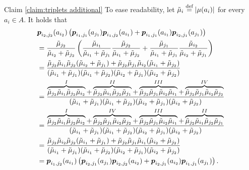 \begin{proofof}{Claim \ref{claim:triplets additional}}
To ease readability, let $\tilde \mu_{i}\stackrel{\text{def}}{=}\left| \mu(a_i) \right|$ for every $a_i\in A$. It holds that
\begin{align*}
&\boldsymbol{ p }_{{i_2},{j_2}}(a_{i_2})\left( \boldsymbol{ p }_{{i_1},{j_1}}(a_{j_1})\boldsymbol{ p }_{{i_1},{j_2}}(a_{i_1})+\boldsymbol{ p }_{{i_1},{j_1}}(a_{i_1})\boldsymbol{ p }_{{i_2},{j_1}}(a_{j_1})\right)\\
&=\frac{\tilde \mu_{j_2}}{\tilde \mu_{i_2}+\tilde \mu_{j_2}}\left( \frac{\tilde \mu_{i_1}}{\tilde \mu_{i_1}+\tilde \mu_{j_1}}\frac{\tilde \mu_{j_2}}{\tilde \mu_{i_1}+\tilde \mu_{j_2}}+\frac{\tilde \mu_{j_1}}{\tilde \mu_{i_1}+\tilde \mu_{j_1}}\frac{\tilde \mu_{i_2}}{\tilde \mu_{i_2}+\tilde \mu_{j_1}}\right) \\
&= \frac{\tilde \mu_{j_2}\tilde \mu_{i_1}\tilde \mu_{j_2}(\tilde \mu_{i_2}+\tilde \mu_{j_1})+\tilde \mu_{j_2}\tilde \mu_{j_1}\tilde \mu_{i_2}(\tilde \mu_{i_1}+\tilde \mu_{j_2})}{(\tilde \mu_{i_1}+\tilde \mu_{j_1})(\tilde \mu_{i_1}+\tilde \mu_{j_2})(\tilde \mu_{i_2}+\tilde \mu_{j_1})(\tilde \mu_{i_2}+\tilde \mu_{j_2})}\\
&= \frac{\overbrace{\tilde \mu_{j_2}\tilde \mu_{i_1}\tilde \mu_{j_2}\tilde \mu_{i_2}}^{I}+\overbrace{\tilde \mu_{j_2}\tilde \mu_{i_1}\tilde \mu_{j_2}\tilde \mu_{j_1}}^{II}+\overbrace{\tilde \mu_{j_2}\tilde \mu_{j_1}\tilde \mu_{i_2}\tilde \mu_{i_1}}^{III}+\overbrace{\tilde \mu_{j_2}\tilde \mu_{j_1}\tilde \mu_{i_2}\tilde \mu_{j_2}}^{IV}}{(\tilde \mu_{i_1}+\tilde \mu_{j_1})(\tilde \mu_{i_1}+\tilde \mu_{j_2})(\tilde \mu_{i_2}+\tilde \mu_{j_1})(\tilde \mu_{i_2}+\tilde \mu_{j_2})}\\
&= \frac{\overbrace{\tilde \mu_{j_2}\tilde \mu_{i_1}\tilde \mu_{j_2}\tilde \mu_{i_2}}^{I}+\overbrace{\tilde \mu_{j_2}\tilde \mu_{j_1}\tilde \mu_{i_2}\tilde \mu_{j_2}}^{IV}+\overbrace{\tilde \mu_{j_2}\tilde \mu_{j_1}\tilde \mu_{i_2}\tilde \mu_{i_1}}^{III}+\overbrace{\tilde \mu_{j_2}\tilde \mu_{i_1}\tilde \mu_{j_2}\tilde \mu_{j_1}}^{II}}{(\tilde \mu_{i_1}+\tilde \mu_{j_1})(\tilde \mu_{i_1}+\tilde \mu_{j_2})(\tilde \mu_{i_2}+\tilde \mu_{j_1})(\tilde \mu_{i_2}+\tilde \mu_{j_2})}\\
&= \frac{\tilde \mu_{j_2}\tilde \mu_{i_2}\tilde \mu_{j_2}(\tilde \mu_{i_1}+\tilde \mu_{j_1})+\tilde \mu_{j_2}\tilde \mu_{j_1}\tilde \mu_{i_1}(\tilde \mu_{i_2}+\tilde \mu_{j_2})}{(\tilde \mu_{i_1}+\tilde \mu_{j_1})(\tilde \mu_{i_1}+\tilde \mu_{j_2})(\tilde \mu_{i_2}+\tilde \mu_{j_1})(\tilde \mu_{i_2}+\tilde \mu_{j_2})}\\
&=\boldsymbol{ p }_{{i_1},{j_2}}(a_{i_1})\left(\boldsymbol{ p }_{{i_2},{j_1}}(a_{j_1})\boldsymbol{ p }_{{i_2},{j_2}}(a_{i_2})+\boldsymbol{ p }_{{i_2},{j_1}}(a_{i_2})\boldsymbol{ p }_{{i_1},{j_1}}(a_{j_1})  \right).
\end{align*}
\end{proofof}
